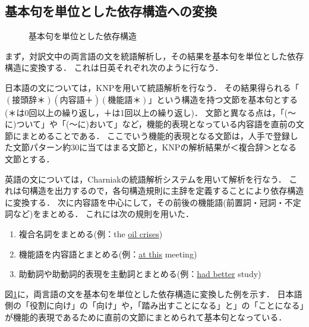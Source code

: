 \subsection{基本句を単位とした依存構造への変換}

\begin{figure}
\begin{center}
 \leavevmode
 \epsfxsize=12cm
 \epsfysize=8.2cm
\caption{基本句を単位とした依存構造}
\label{f_kihonnku2.eps}
\end{center}
\end{figure}

まず，対訳文中の両言語の文を統語解析し，その結果を基本句を単位とした依存構造に変換する．
これは日英それぞれ次のように行なう．

日本語の文については，KNP\cite{Kurohashi1994}を用いて統語解析を行なう．
その結果得られる「$(接頭辞＊)(内容語＋)(機能語＊)$」という構造を持つ文節を基本句とする(＊は0回以上の繰り返し，＋は1回以上の繰り返し)．
文節と異なる点は，「(〜に)ついて」や「(〜に)おいて」など，機能的表現となっている内容語を直前の文節にまとめることである．
ここでいう機能的表現となる文節は，人手で登録した文節パターン約30に当てはまる文節と，KNPの解析結果が＜複合辞＞となる文節とする．

英語の文については，Charniakの統語解析システム\cite{Charniak2000}を用いて解析を行なう．
これは句構造を出力するので，各句構造規則に主辞を定義することにより依存構造に変換する．
次に内容語を中心にして，その前後の機能語(前置詞・冠詞・不定詞など)をまとめる．
これには次の規則を用いた．

\vspace{1ex}
\begin{enumerate}

\item 複合名詞をまとめる(例：the \underline{oil crises})

\item 機能語を内容語とまとめる(例：\underline{at this} meeting)

\item 助動詞や助動詞的表現を主動詞とまとめる(例：\underline{had better} study)

\end{enumerate}
\vspace{1ex}

図\ref{f_kihonnku2.eps}に，両言語の文を基本句を単位とした依存構造に変換した例を示す．
日本語側の「役割に向け」の「向け」や，「踏み出すことになる」と」の「ことになる」が機能的表現であるために直前の文節にまとめられて基本句となっている．

